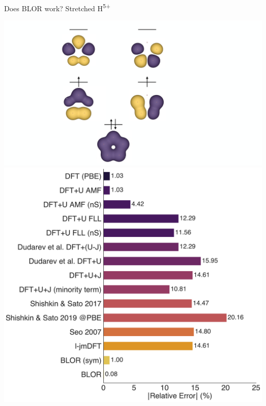 \documentclass[xcolor=table,aspectratio=169]{beamer}
\numberwithin{equation}{section}
\begin{document}
\begin{frame}{Does BLOR work? Stretched H\textsuperscript{5+}}
    \begin{center}
        \includegraphics[height=0.8\textheight]{figures/burgess/mo3.pdf}
        \hspace{0.05\textwidth}
        \includegraphics[height=0.8\textheight]{figures/burgess/h5+_extended.pdf}
    \end{center}
\end{frame}
\end{document}

